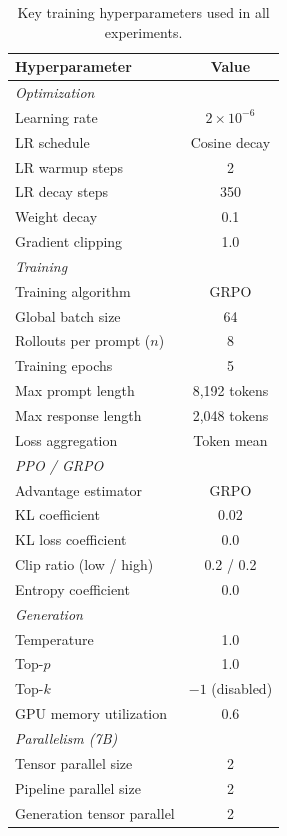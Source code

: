
\begin{table}[h]
\centering
\caption{Key training hyperparameters used in all experiments.}
\label{tab:training_params}
\small
\begin{tabular}{lc}
\toprule
\textbf{Hyperparameter} & \textbf{Value} \\
\midrule
\multicolumn{2}{l}{\textit{Optimization}} \\
Learning rate              & $2 \times 10^{-6}$ \\
LR schedule                & Cosine decay \\
LR warmup steps            & 2 \\
LR decay steps             & 350 \\
Weight decay               & 0.1 \\
Gradient clipping          & 1.0 \\
\midrule
\multicolumn{2}{l}{\textit{Training}} \\
Training algorithm         & GRPO \\
Global batch size          & 64 \\
Rollouts per prompt ($n$)  & 8 \\
Training epochs            & 5 \\
Max prompt length          & 8{,}192 tokens \\
Max response length        & 2{,}048 tokens \\
Loss aggregation           & Token mean \\
\midrule
\multicolumn{2}{l}{\textit{PPO / GRPO}} \\
Advantage estimator        & GRPO \\
KL coefficient             & 0.02 \\
KL loss coefficient        & 0.0 \\
Clip ratio (low / high)    & 0.2 / 0.2 \\
Entropy coefficient        & 0.0 \\
\midrule
\multicolumn{2}{l}{\textit{Generation}} \\
Temperature                & 1.0 \\
Top-$p$                    & 1.0 \\
Top-$k$                    & $-1$ (disabled) \\
GPU memory utilization     & 0.6 \\
\midrule
\multicolumn{2}{l}{\textit{Parallelism (7B)}} \\
Tensor parallel size       & 2 \\
Pipeline parallel size     & 2 \\
Generation tensor parallel & 2 \\
\bottomrule
\end{tabular}
\end{table}
